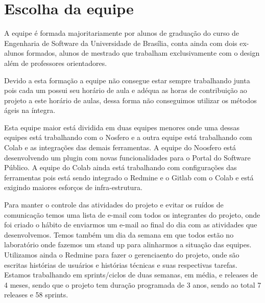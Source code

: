 \section{Escolha da equipe}
\label{sec:equipe}

	A equipe é formada majoritariamente por alunos de graduação do curso de Engenharia de Software da Universidade de Brasília, conta ainda com dois ex-alunos formados, alunos de mestrado que trabalham exclusivamente com o design além de professores orientadores. 
	
	Devido a esta formação a equipe não consegue estar sempre trabalhando junta pois cada um possui seu horário de aula e adéqua as horas de contribuição ao projeto a este horário de aulas, dessa forma não conseguimos utilizar os métodos ágeis na íntegra.
	
	Esta equipe maior está dividida em duas equipes menores onde uma dessas equipes está trabalhando com o Nosfero e a outra equipe está trabalhando com Colab e as integrações das demais ferramentas. A equipe do Noosfero está desenvolvendo um plugin com novas funcionalidades para o Portal do Software Público. A equipe do Colab ainda está trabalhando com configurações das ferramentas pois está sendo integrado o Redmine e o Gitlab com o Colab e está exigindo maiores esforços de infra-estrutura.
	
	Para manter o controle das atividades do projeto e evitar os ruídos de comunicação temos uma lista de e-mail com todos os integrantes do projeto, onde foi criado o hábito de enviarmos um e-mail ao final do dia com as atividades que desenvolvemos. Temos também um dia da semana em que todos estão no laboratório onde fazemos um stand up para alinharmos a situação das equipes. Utilizamos ainda o Redmine para fazer o gerenciaento do projeto, onde são escritas histórias de usuários e histórias técnicas e suas respectivas tarefas. Estamos trabalhando em sprints/ciclos de duas semanas, em média, e releases de 4 meses, sendo que o projeto tem duração programada de 3 anos, sendo ao total 7 releases e 58 sprints.